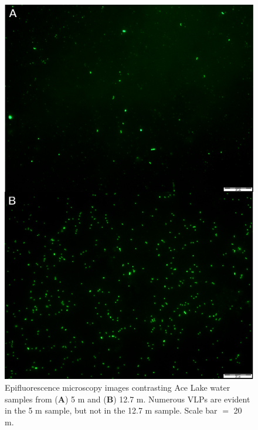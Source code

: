 \begin{figure}
\includegraphics[width=\textwidth]{ace_figures/virus_compare.pdf}
\caption[Lack of \acs{VLP} in 5 m and 12.7 m Ace Lake samples]{Epifluorescence microscopy images contrasting Ace Lake water samples from (\textbf{A}) 5 m and (\textbf{B}) 12.7 m. Numerous \acp{VLP} are evident in the 5 m sample, but not in the 12.7 m sample. Scale bar $=$ 20 \textmu{}m.
}
\label{fig:virus_compare}

\end{figure}
